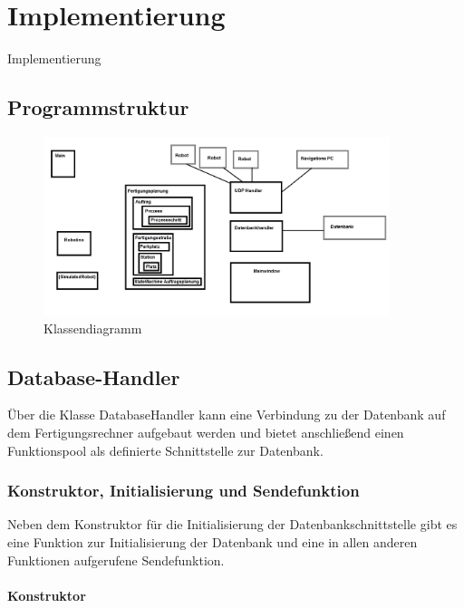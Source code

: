 
\chapter{Implementierung}
\label{sec:Implementierung}

Implementierung

\section{Programmstruktur}

\begin{figure}[htb]
    \centering
    \includegraphics[width=0.9\textwidth]{Abbildungen/Klassendiagramm.PNG}
    \caption{Klassendiagramm}		
    \label{fig:Klassendiagramm}
\end{figure}



\section{Database-Handler}
\label{sec:Databasehandler}

Über die Klasse DatabaseHandler kann eine Verbindung zu der Datenbank auf dem Fertigungsrechner aufgebaut werden und bietet anschließend einen Funktionspool als definierte Schnittstelle zur Datenbank.

\subsection{Konstruktor, Initialisierung und Sendefunktion}

Neben dem Konstruktor für die Initialisierung der Datenbankschnittstelle gibt es eine Funktion zur Initialisierung der Datenbank und eine in allen anderen Funktionen aufgerufene Sendefunktion. 

\subsubsection{Konstruktor}

